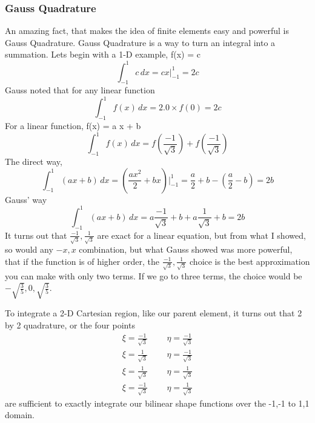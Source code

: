 \documentclass{article}
\begin{document}
\subsubsection{Gauss Quadrature}

An amazing fact, that makes the idea of finite elements easy and powerful is
Gauss Quadrature.   Gauss Quadrature is a way to turn an integral into a
summation.   Lets begin with a 1-D example, f(x) = c
\begin{equation}
\int _{-1} ^1 c \, dx = c x | _{-1} ^1 = 2 c 
\end{equation}
Gauss noted that for any linear function 
\begin{equation}
\int _{-1} ^{1} f(x) \, dx =  2.0 \times f( 0 ) = 2 c
\end{equation}
For a linear function, f(x) = a x + b
\begin{equation}
\int _{-1} ^{1} f(x) \, dx = f(\frac{-1}{\sqrt{3}}) + f(\frac{-1}{\sqrt{3}})
\end{equation}
The direct way,
\begin{equation}
\int _{-1} ^{1} (ax + b) \, dx = (\frac{ax^2}{2} + bx) | _{-1} ^1 = 
\frac{a}{2} + b - (\frac{a}{2} -b) = 2b
\end{equation}
Gauss' way
\begin{equation}
\int _{-1} ^{1} (ax + b) \, dx = a \frac{-1}{\sqrt{3}} + b + a \frac{1}{\sqrt{3}}
+ b = 2b
\end{equation}
It turns out that $\frac{-1}{\sqrt{3}}, \frac{1}{\sqrt{3}}$ are exact for a
linear equation, but from what I showed, so would any $-x, x$ combination, but
what Gauss showed was more powerful, that if the function is of higher order,
the $ \frac{-1}{\sqrt{3}}, \frac{1}{\sqrt{3}}$ choice is the best approximation
you can make with only two terms.   If we go to three terms, the choice would
be $ -\sqrt{\frac{3}{5}} , 0 , \sqrt{\frac{3}{5}}$.

To integrate a 2-D Cartesian region, like our parent element, it turns out that
2 by 2 quadrature, or the four points 
\begin{eqnarray}   
\xi =  \frac{-1}{\sqrt{3}} & ~~~ & \eta =  \frac{-1}{\sqrt{3}} \\
\xi =  \frac{ 1}{\sqrt{3}} & ~~~ & \eta =  \frac{-1}{\sqrt{3}} \\
\xi =  \frac{ 1}{\sqrt{3}} & ~~~ & \eta =  \frac{ 1}{\sqrt{3}} \\
\xi =  \frac{-1}{\sqrt{3}} & ~~~ & \eta =  \frac{ 1}{\sqrt{3}} 
\end{eqnarray}
are sufficient to exactly integrate our bilinear shape functions over the
{-1,-1} to {1,1} domain.
\end{document}
